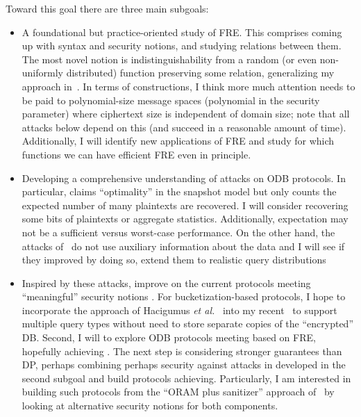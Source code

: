 Toward  this goal there are three main subgoals:
 \begin{itemize}
 \item A foundational but practice-oriented study of FRE.  This comprises coming up with syntax and security notions, and studying relations between them.  The most novel notion is indistinguishability from a random (or even non-uniformly distributed) function preserving some relation, generalizing my approach in~\cite{EC:BCLO09}. %
 In terms of constructions, I think more much attention needs to be paid to polynomial-size message spaces (polynomial in the security parameter) where ciphertext size is independent of domain size; note that all attacks below depend on this (and succeed in a reasonable amount of time).  Additionally, I will  identify new applications of FRE and study  for which functions we can have efficient FRE even in principle. %
 
 \item Developing a  comprehensive understanding of attacks on ODB protocols. In particular,  \cite{EPRINT:BGCRS17} claims ``optimality'' in the snapshot model but only  counts the expected number of many plaintexts are  recovered.  I will consider recovering some bits of plaintexts or aggregate  statistics.  Additionally, expectation may not be a sufficient versus worst-case performance. On the other hand, the attacks of~\cite{CCS:KKNO16} do not use auxiliary information about the data and I will see if they improved by doing so, extend them to realistic query distributions 
 \item Inspired by these attacks, improve on the current protocols meeting  ``meaningful'' security notions .  For bucketization-based protocols, I hope to incorporate the approach of Hacigumus \emph{et al.}~\cite{Hacigumus:2002} into my recent~\cite{KKNO17} to support multiple query types without need to store separate copies of the ``encrypted'' DB.  Second, I  will  to explore ODB protocols meeting based on FRE, hopefully achieving .  The next step is considering stronger guarantees than DP, perhaps combining perhaps security against  attacks in developed in the second subgoal and build protocols achieving.  Particularly, I am interested in building such protocols from the ``ORAM plus sanitizer'' approach of~\cite{KKNO17} by looking at alternative security notions for both components.
 

\end{itemize}
